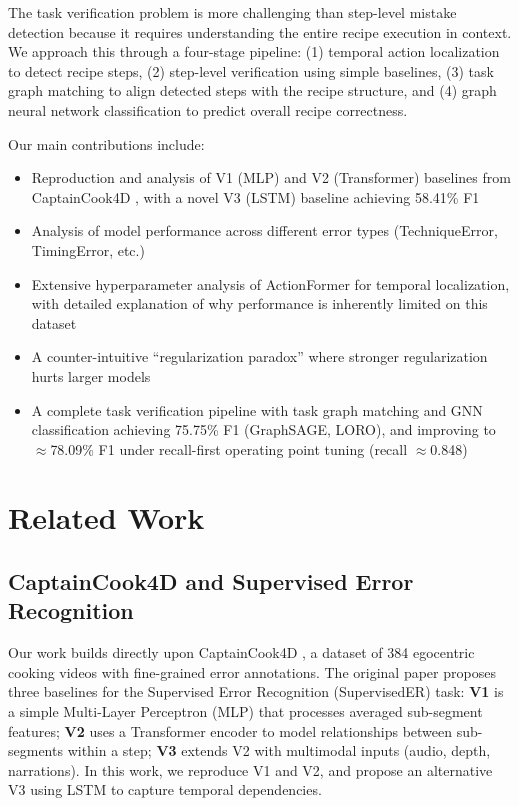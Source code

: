 \documentclass[10pt,twocolumn,letterpaper]{article}
\begin{document}
The task verification problem is more challenging than step-level mistake detection because it requires understanding the entire recipe execution in context. We approach this through a four-stage pipeline: (1) temporal action localization to detect recipe steps, (2) step-level verification using simple baselines, (3) task graph matching to align detected steps with the recipe structure, and (4) graph neural network classification to predict overall recipe correctness.

Our main contributions include:
\begin{itemize}
    \item Reproduction and analysis of V1 (MLP) and V2 (Transformer) baselines from CaptainCook4D \cite{peddi2024captaincook4d}, with a novel V3 (LSTM) baseline achieving 58.41\% F1
    \item Analysis of model performance across different error types (TechniqueError, TimingError, etc.)
    \item Extensive hyperparameter analysis of ActionFormer for temporal localization, with detailed explanation of why performance is inherently limited on this dataset
    \item A counter-intuitive ``regularization paradox'' where stronger regularization hurts larger models
    \item A complete task verification pipeline with task graph matching and GNN classification achieving 75.75\% F1 (GraphSAGE, LORO), and improving to $\approx$78.09\% F1 under recall-first operating point tuning (recall $\approx$0.848)
\end{itemize}

\section{Related Work}

\subsection{CaptainCook4D and Supervised Error Recognition}

Our work builds directly upon CaptainCook4D \cite{peddi2024captaincook4d}, a dataset of 384 egocentric cooking videos with fine-grained error annotations. The original paper proposes three baselines for the Supervised Error Recognition (SupervisedER) task: \textbf{V1} is a simple Multi-Layer Perceptron (MLP) that processes averaged sub-segment features; \textbf{V2} uses a Transformer encoder to model relationships between sub-segments within a step; \textbf{V3} extends V2 with multimodal inputs (audio, depth, narrations). In this work, we reproduce V1 and V2, and propose an alternative V3 using LSTM to capture temporal dependencies.
\end{document}
